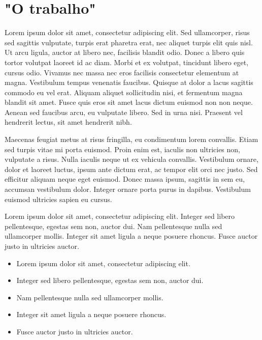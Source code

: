 \documentclass[12pt]{article}
\begin{document}

\section{"O trabalho"}

Lorem ipsum dolor sit amet, consectetur adipiscing elit. Sed ullamcorper, risus sed sagittis vulputate, turpis erat pharetra erat, nec aliquet turpis elit quis nisl. Ut arcu ligula, auctor at libero nec, facilisis blandit odio. Donec a libero quis tortor volutpat laoreet id ac diam. Morbi et ex volutpat, tincidunt libero eget, cursus odio. Vivamus nec massa nec eros facilisis consectetur elementum at magna. Vestibulum tempus venenatis faucibus. Quisque at dolor a lacus sagittis commodo eu vel erat. Aliquam aliquet sollicitudin nisi, et fermentum magna blandit sit amet. Fusce quis eros sit amet lacus dictum euismod non non neque. Aenean sed faucibus arcu, eu vulputate libero. Sed in urna nisi. Praesent vel hendrerit lectus, sit amet hendrerit nibh.

Maecenas feugiat metus at risus fringilla, eu condimentum lorem convallis. Etiam sed turpis vitae mi porta euismod. Proin enim est, iaculis non ultricies non, vulputate a risus. Nulla iaculis neque ut ex vehicula convallis. Vestibulum ornare, dolor et laoreet luctus, ipsum ante dictum erat, ac tempor elit orci nec justo. Sed efficitur aliquam neque eget euismod. Donec massa ipsum, sagittis in sem eu, accumsan vestibulum dolor. Integer ornare porta purus in dapibus. Vestibulum euismod ultricies sapien eu cursus. 

Lorem ipsum dolor sit amet, consectetur adipiscing elit.
Integer sed libero pellentesque, egestas sem non, auctor dui.
Nam pellentesque nulla sed ullamcorper mollis.
Integer sit amet ligula a neque posuere rhoncus.
Fusce auctor justo in ultricies auctor.

\begin{itemize}
	\item Lorem ipsum dolor sit amet, consectetur adipiscing elit.
	\item Integer sed libero pellentesque, egestas sem non, auctor dui.
	\item Nam pellentesque nulla sed ullamcorper mollis.
	\item Integer sit amet ligula a neque posuere rhoncus.
	\item Fusce auctor justo in ultricies auctor.
\end{itemize}
\end{document}
